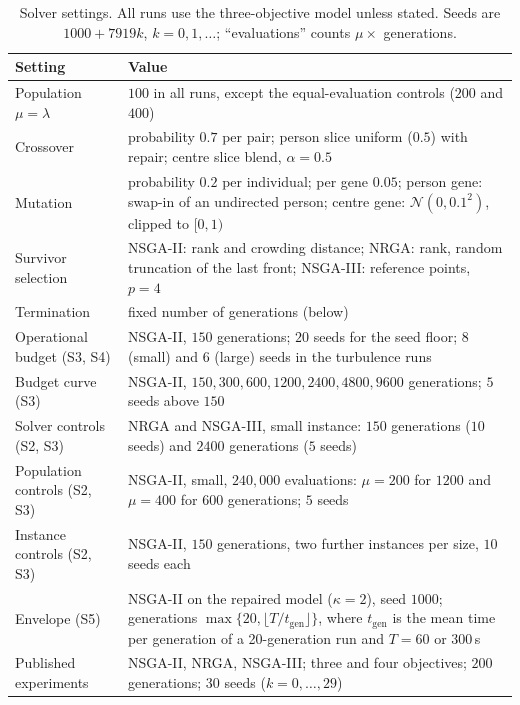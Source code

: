 \begin{table}[H]
\centering
\caption{Solver settings. All runs use the three-objective model unless stated. Seeds are
$1000+7919k$, $k=0,1,\dots$; ``evaluations'' counts $\mu\times$ generations.\label{tab:params}}
\small
\begin{tabularx}{\textwidth}{@{}>{\raggedright\arraybackslash}p{3.6cm}>{\raggedright\arraybackslash}X@{}}
\toprule
Setting & Value\\
\midrule
Population $\mu=\lambda$ & $100$ in all runs, except the equal-evaluation controls ($200$ and $400$)\\
Crossover & probability $0.7$ per pair; person slice uniform ($0.5$) with repair; centre slice blend, $\alpha=0.5$\\
Mutation & probability $0.2$ per individual; per gene $0.05$; person gene: swap-in of an undirected person; centre gene: $\mathcal{N}(0,0.1^2)$, clipped to $[0,1)$\\
Survivor selection & NSGA-II: rank and crowding distance; NRGA: rank, random truncation of the last front; NSGA-III: reference points, $p=4$\\
Termination & fixed number of generations (below)\\
\midrule
Operational budget (S3, S4) & NSGA-II, $150$ generations; $20$ seeds for the seed floor; $8$ (small) and $6$ (large) seeds in the turbulence runs\\
Budget curve (S3) & NSGA-II, $150, 300, 600, 1200, 2400, 4800, 9600$ generations; $5$ seeds above $150$\\
Solver controls (S2, S3) & NRGA and NSGA-III, small instance: $150$ generations ($10$ seeds) and $2400$ generations ($5$ seeds)\\
Population controls (S2, S3) & NSGA-II, small, $240{,}000$ evaluations: $\mu=200$ for $1200$ and $\mu=400$ for $600$ generations; $5$ seeds\\
Instance controls (S2, S3) & NSGA-II, $150$ generations, two further instances per size, $10$ seeds each\\
Envelope (S5) & NSGA-II on the repaired model ($\kappa=2$), seed $1000$; generations $\max\{20,\lfloor T/t_{\mathrm{gen}}\rfloor\}$, where $t_{\mathrm{gen}}$ is the mean time per generation of a 20-generation run and $T=60$ or $300$\,s\\
Published experiments~\cite{rabiei2026resilient} & NSGA-II, NRGA, NSGA-III; three and four objectives; $200$ generations; $30$ seeds ($k=0,\dots,29$)\\
\bottomrule
\end{tabularx}
\end{table}


